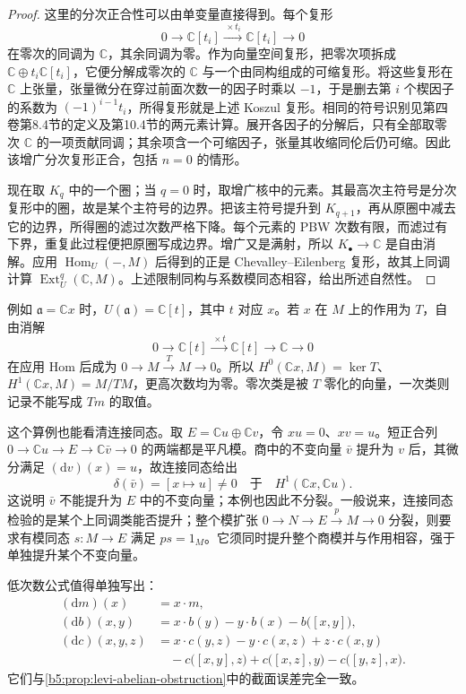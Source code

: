 \begin{proof}
	这里的分次正合性可以由单变量直接得到。每个复形
	\[
		0\longrightarrow\mathbb C[t_i] \xrightarrow{\,\times t_i\,}\mathbb C[t_i] \longrightarrow0
	\]
	在零次的同调为 \(\mathbb C\)，其余同调为零。作为向量空间复形，把零次项拆成 \(\mathbb C\oplus t_i\mathbb C[t_i]\)，它便分解成零次的 \(\mathbb C\) 与一个由同构组成的可缩复形。将这些复形在 \(\mathbb C\) 上张量，张量微分在穿过前面次数一的因子时乘以 \(-1\)，于是删去第 \(i\) 个楔因子的系数为 \((-1)^{i-1}t_i\)，所得复形就是上述 Koszul 复形。相同的符号识别见第四卷第8.4节的定义及第10.4节的两元素计算。展开各因子的分解后，只有全部取零次 \(\mathbb C\) 的一项贡献同调；其余项含一个可缩因子，张量其收缩同伦后仍可缩。因此该增广分次复形正合，包括 \(n=0\) 的情形。

	现在取 \(K_q\) 中的一个圈；当 \(q=0\) 时，取增广核中的元素。其最高次主符号是分次复形中的圈，故是某个主符号的边界。把该主符号提升到 \(K_{q+1}\)，再从原圈中减去它的边界，所得圈的滤过次数严格下降。每个元素的 PBW 次数有限，而滤过有下界，重复此过程便把原圈写成边界。增广又是满射，所以 \(K_\bullet\to\mathbb C\) 是自由消解。应用 \(\operatorname{Hom}_U(-,M)\) 后得到的正是 Chevalley--Eilenberg 复形，故其上同调计算 \(\operatorname{Ext}^q_U(\mathbb C,M)\)。上述限制同构与系数模同态相容，给出所述自然性。
\end{proof}

例如 \(\mathfrak a=\mathbb Cx\) 时，\(U(\mathfrak a)=\mathbb C[t]\)，其中 \(t\) 对应 \(x\)。若 \(x\) 在 \(M\) 上的作用为 \(T\)，自由消解
\[
	0\longrightarrow\mathbb C[t] \xrightarrow{\,\times t\,}\mathbb C[t] \longrightarrow\mathbb C\longrightarrow0
\]
在应用 Hom 后成为 \(0\to M\xrightarrow{T}M\to0\)。所以 \(H^0(\mathbb Cx,M)=\ker T\)、\(H^1(\mathbb Cx,M)=M/TM\)，更高次数均为零。零次类是被 \(T\) 零化的向量，一次类则记录不能写成 \(Tm\) 的取值。

\ProseParagraphBreak

这个算例也能看清连接同态。取 \(E=\mathbb Cu\oplus\mathbb Cv\)，令 \(xu=0\)、\(xv=u\)。短正合列 \(0\to\mathbb Cu\to E\to\mathbb C\bar v\to0\) 的两端都是平凡模。商中的不变向量 \(\bar v\) 提升为 \(v\) 后，其微分满足 \((\mathrm{d}v)(x)=u\)，故连接同态给出
\[
	\delta(\bar v)=[x\mapsto u]\ne0 \quad\text{于}\quad H^1(\mathbb Cx,\mathbb Cu).
\]
这说明 \(\bar v\) 不能提升为 \(E\) 中的不变向量；本例也因此不分裂。一般说来，连接同态检验的是某个上同调类能否提升；整个模扩张 \(0\to N\to E\overset p\to M\to0\) 分裂，则要求有模同态 \(s:M\to E\) 满足 \(ps=1_M\)。它须同时提升整个商模并与作用相容，强于单独提升某个不变向量。

\ProseParagraphBreak

低次数公式值得单独写出：
\begin{align*}
	(\mathrm{d}m)(x)&=x\cdot m,\\
	(\mathrm{d}b)(x,y)&=x\cdot b(y)-y\cdot b(x)-b\bigl([x,y]\bigr),\\
	(\mathrm{d}c)(x,y,z)&=x\cdot c(y,z)-y\cdot c(x,z)+z\cdot c(x,y)\\
	&\quad-c\bigl([x,y],z\bigr)+c\bigl([x,z],y\bigr) -c\bigl([y,z],x\bigr).
\end{align*}
它们与\cref{b5:prop:levi-abelian-obstruction}中的截面误差完全一致。


